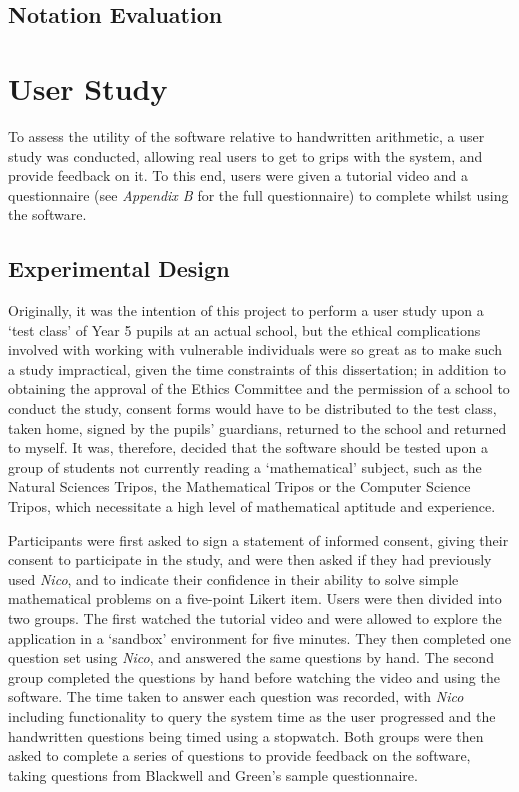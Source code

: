 \documentclass[12pt,twoside,notitlepage,xetex]{report}
\begin{document}
\subsection{Notation Evaluation}

\section{User Study}

To assess the utility of the software relative to handwritten arithmetic, a
user study was conducted, allowing real users to get to grips with the system,
and provide feedback on it.  To this end, users were given a tutorial video and
a questionnaire (see \emph{Appendix B} for the full questionnaire) to complete
whilst using the software.

\subsection{Experimental Design}

Originally, it was the intention of this project to perform a user study upon
a `test class' of Year 5 pupils at an actual school, but the ethical
complications involved with working with vulnerable individuals were so great
as to make such a study impractical, given the time constraints of this
dissertation; in addition to obtaining the approval of the Ethics Committee and
the permission of a school to conduct the study, consent forms would have to be
distributed to the test class, taken home, signed by the pupils' guardians,
returned to the school and returned to myself.  It was, therefore, decided that
the software should be tested upon a group of students not currently reading a
`mathematical' subject, such as the Natural Sciences Tripos, the Mathematical
Tripos or the Computer Science Tripos, which necessitate a high level of
mathematical aptitude and experience.

Participants were first asked to sign a statement of informed consent, giving
their consent to participate in the study, and were then asked if they had
previously used \emph{Nico}, and to indicate their confidence in their ability
to solve simple mathematical problems on a five-point Likert item.  Users were
then divided into two groups.  The first watched the tutorial video and were
allowed to explore the application in a `sandbox' environment for five
minutes.  They then completed one question set using \emph{Nico}, and answered
the same questions by hand.  The second group completed the questions by hand
before watching the video and using the software.  The time taken to answer
each question was recorded, with \emph{Nico} including functionality to query
the system time as the user progressed and the handwritten questions being
timed using a stopwatch.  Both groups were then asked to complete a series of
questions to provide feedback on the software, taking questions from Blackwell
and Green's sample questionnaire. \cite{Blackwell2000}
\end{document}
